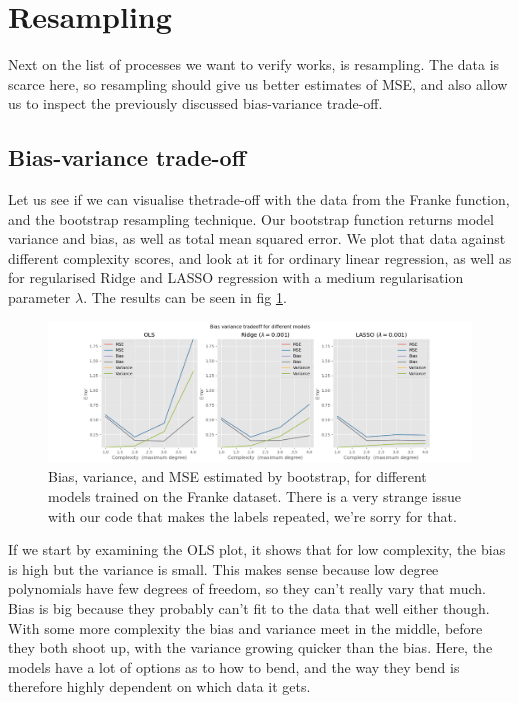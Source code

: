\documentclass[11pt, a4paper]{report}
\begin{document}
\section{Resampling}

Next on the list of processes we want to verify works, is resampling. The data is scarce here, so resampling should give us better estimates of MSE, and also allow us to inspect the previously discussed bias-variance trade-off.

\subsection{Bias-variance trade-off}

Let us see if we can visualise thetrade-off with the data from the Franke function, and the bootstrap resampling technique. Our bootstrap function returns model variance and bias, as well as total mean squared error. We plot that data against different complexity scores, and look at it for ordinary linear regression, as well as for regularised Ridge and LASSO regression with a medium regularisation parameter $\lambda$. The results can be seen in fig \ref{fig:bias_variance_franke}.

\begin{figure}
\includegraphics[width=\textwidth]{../plots/bias_variance_franke.png}
\caption{Bias, variance, and MSE estimated by bootstrap, for different models trained on the Franke dataset. There is a very strange issue with our code that makes the labels repeated, we're sorry for that.}
\label{fig:bias_variance_franke}
\end{figure}

If we start by examining the OLS plot, it shows that for low complexity, the bias is high but the variance is small. This makes sense because low degree polynomials have few degrees of freedom, so they can't really vary that much. Bias is big because they probably can't fit to the data that well either though. With some more complexity the bias and variance meet in the middle, before they both shoot up, with the variance growing quicker than the bias. Here, the models have a lot of options as to how to bend, and the way they bend is therefore highly dependent on which data it gets.
\end{document}
